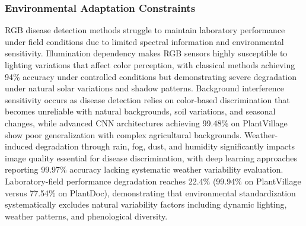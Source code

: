 \documentclass[sn-mathphys]{sn-jnl}
\theoremstyle{thmstyleone}%
\theoremstyle{thmstyletwo}%
\theoremstyle{thmstylethree}%
\begin{document}
\subsubsection{Environmental Adaptation Constraints}
RGB disease detection methods struggle to maintain laboratory performance under field conditions due to limited spectral information and environmental sensitivity. Illumination dependency makes RGB sensors highly susceptible to lighting variations that affect color perception, with classical methods \citep{arivazhagan2013detection} achieving 94\% accuracy under controlled conditions but demonstrating severe degradation under natural solar variations and shadow patterns. Background interference sensitivity occurs as disease detection relies on color-based discrimination that becomes unreliable with natural backgrounds, soil variations, and seasonal changes, while advanced CNN architectures \citep{ferentinos2018deep} achieving 99.48\% on PlantVillage show poor generalization with complex agricultural backgrounds. Weather-induced degradation through rain, fog, dust, and humidity significantly impacts image quality essential for disease discrimination, with deep learning approaches \citep{atila2021plant} reporting 99.97\% accuracy lacking systematic weather variability evaluation. Laboratory-field performance degradation reaches 22.4\% \citep{yu2023inception} (99.94\% on PlantVillage versus 77.54\% on PlantDoc), demonstrating that environmental standardization systematically excludes natural variability factors including dynamic lighting, weather patterns, and phenological diversity.
\end{document}
